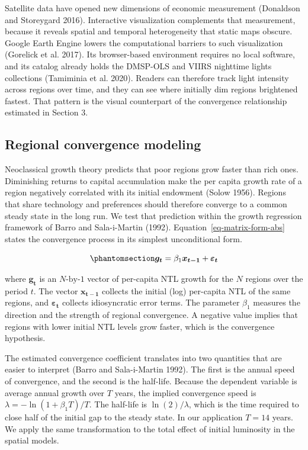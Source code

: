 \documentclass[
  letterpaper,
  DIV=11,
  numbers=noendperiod]{scrartcl}
\begin{document}
Satellite data have opened new dimensions of economic measurement
(Donaldson and Storeygard 2016). Interactive visualization complements
that measurement, because it reveals spatial and temporal heterogeneity
that static maps obscure. Google Earth Engine lowers the computational
barriers to such visualization (Gorelick et al. 2017). Its browser-based
environment requires no local software, and its catalog already holds
the DMSP-OLS and VIIRS nighttime lights collections (Tamiminia et al.
2020). Readers can therefore track light intensity across regions over
time, and they can see where initially dim regions brightened fastest.
That pattern is the visual counterpart of the convergence relationship
estimated in Section 3.

\subsection{Regional convergence
modeling}\label{regional-convergence-modeling}

Neoclassical growth theory predicts that poor regions grow faster than
rich ones. Diminishing returns to capital accumulation make the per
capita growth rate of a region negatively correlated with its initial
endowment (Solow 1956). Regions that share technology and preferences
should therefore converge to a common steady state in the long run. We
test that prediction within the growth regression framework of Barro and
Sala-i-Martin (1992). Equation~\ref{eq-matrix-form-abs} states the
convergence process in its simplest unconditional form.

\begin{equation}\phantomsection\label{eq-matrix-form-abs}{
\boldsymbol{g_t} =  \beta_1 \boldsymbol{x_{t-1}} +  \boldsymbol{\varepsilon_t}
}\end{equation}

where \(\boldsymbol{g_t}\) is an \(N\text{-by-}1\) vector of per-capita
NTL growth for the \(N\) regions over the period \(t\). The vector
\(\boldsymbol{x_{t-1}}\) collects the initial (log) per-capita NTL of
the same regions, and \(\boldsymbol{\varepsilon_t}\) collects
idiosyncratic error terms. The parameter \(\beta_1\) measures the
direction and the strength of regional convergence. A negative value
implies that regions with lower initial NTL levels grow faster, which is
the convergence hypothesis.

The estimated convergence coefficient translates into two quantities
that are easier to interpret (Barro and Sala-i-Martin 1992). The first
is the annual speed of convergence, and the second is the half-life.
Because the dependent variable is average annual growth over \(T\)
years, the implied convergence speed is
\(\lambda = -\ln(1 + \beta_1 T)/T\). The half-life is
\(\ln(2)/\lambda\), which is the time required to close half of the
initial gap to the steady state. In our application \(T = 14\) years. We
apply the same transformation to the total effect of initial luminosity
in the spatial models.
\end{document}
